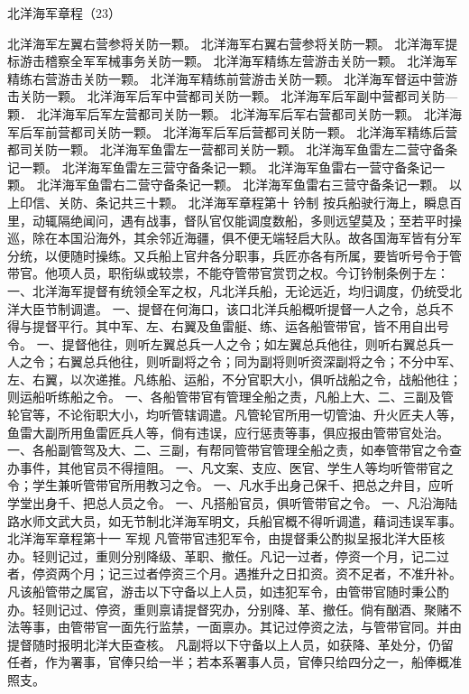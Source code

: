 \documentclass[12pt,UTF8]{ctexbook}
\begin{document}
北洋海军章程（23）

北洋海军左翼右营参将关防一颗。
北洋海军右翼右营参将关防一颗。
北洋海军提标游击稽察全军军械事务关防一颗。
北洋海军精练左营游击关防一颗。
北洋海军精练右营游击关防一颗。
北洋海军精练前营游击关防一颗。
北洋海军督运中营游击关防一颗。
北洋海军后军中营都司关防一颗。
北洋海军后军副中营都司关防—颗．
北洋海军后军左营都司关防一颗。
北洋海军后军右营都司关防一颗。
北洋海军后军前营都司关防一颗。
北洋海军后军后营都司关防一颗。
北洋海军精练后营都司关防一颗。
北洋海军鱼雷左一营都司关防一颗。
北洋海军鱼雷左二营守备条记一颗。
北洋海军鱼雷左三营守备条记一颗。
北洋海军鱼雷右一营守备条记一颗。
北洋海军鱼雷右二营守备条记一颗。
北洋海军鱼雷右三营守备条记一颗。
以上印信、关防、条记共三十颗。
北洋海军章程第十
钤制
按兵船驶行海上，瞬息百里，动辄隔绝闻问，遇有战事，督队官仅能调度数船，多则远望莫及；至若平时操巡，除在本国沿海外，其余邻近海疆，俱不便无端轻启大队。故各国海军皆有分军分统，以便随时操练。又兵船上官弁各分职事，兵匠亦各有所属，要皆听号令于管带官。他项人员，职衔纵或较祟，不能夺管带官赏罚之权。今订钤制条例于左：
一、北洋海军提督有统领全军之权，凡北洋兵船，无论远近，均归调度，仍统受北洋大臣节制调遣。
一、提督在何海口，该口北洋兵船概听提督一人之令，总兵不得与提督平行。其中军、左、右翼及鱼雷艇、练、运各船管带官，皆不用自出号令。
一、提督他往，则听左翼总兵一人之令；如左翼总兵他往，则听右翼总兵一人之令；右翼总兵他往，则听副将之令；同为副将则听资深副将之令；不分中军、左、右翼，以次递推。凡练船、运船，不分官职大小，俱听战船之令，战船他往；则运船听练船之令。
一、各船管带官有管理全船之责，凡船上大、二、三副及管轮官等，不论衔职大小，均听管辖调遣。凡管轮官所用一切管油、升火匠夫人等，鱼雷大副所用鱼雷匠兵人等，倘有违误，应行惩责等事，俱应报由管带官处治。
一、各船副管驾及大、二、三副，有帮同管带官管理全船之责，如奉管带官之令查办事件，其他官员不得擅阻。
一、凡文案、支应、医官、学生人等均听管带官之令；学生兼听管带官所用教习之令。
一、凡水手出身己保千、把总之弁目，应听学堂出身千、把总人员之令。
一、凡搭船官员，俱听管带官之令。
一、凡沿海陆路水师文武大员，如无节制北洋海军明文，兵船官概不得听调遣，藉词违误军事。
北洋海军章程第十一
军规
凡管带官违犯军令，由提督秉公酌拟呈报北洋大臣核办。轻则记过，重则分别降级、革职、撤任。凡记一过者，停资一个月，记二过者，停资两个月；记三过者停资三个月。遇推升之日扣资。资不足者，不准升补。
凡该船管带之属官，游击以下守备以上人员，如违犯军令，由管带官随时秉公酌办。轻则记过、停资，重则禀请提督究办，分别降、革、撤任。倘有酗酒、聚赌不法等事，由管带官一面先行监禁，一面禀办。其记过停资之法，与管带官同。并由提督随时报明北洋大臣查核。
凡副将以下守备以上人员，如获降、革处分，仍留任者，作为署事，官俸只给一半；若本系署事人员，官俸只给四分之一，船俸概准照支。
\end{document}
